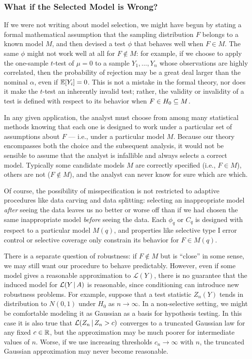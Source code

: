 \documentclass{article}
\theoremstyle{definition}
\newcommand{\cL}{\mathcal{L}}
\newcommand{\sampOrData}{data }
\begin{document}
\subsubsection{What if the Selected Model is Wrong?}\label{sec:modelWrong}

If we were not writing about model selection, we might have begun by stating a formal mathematical assumption that the sampling distribution $F$ belongs to a known model $M$, and then devised a test $\phi$ that behaves well when $F\in M$. The same $\phi$ might not work well at all for $F\notin M$: for example, if we choose to apply the one-sample $t$-test of $\mu=0$ to a sample $Y_1,\ldots,Y_n$ whose observations are highly correlated, then the probability of rejection may be a great deal larger than the nominal $\alpha$, even if $\mathbb{E}[Y_i]=0$. This is not a mistake in the formal theory, nor does it make the $t$-test an inherently invalid test; rather, the validity or invalidity of a test is defined with respect to its behavior when $F\in H_0 \subseteq M$.

In any given application, the analyst must choose from among many statistical methods knowing that each one is designed to work under a particular set of assumptions about $F$ --- i.e., under a particular model $M$. Because our theory encompasses both the choice and the subsequent analysis, it would not be sensible to assume that the analyst is infallible and always selects a correct model. Typically some candidate models $M$ are correctly specified (i.e., $F\in M$), others are not ($F\notin M$), and the analyst can never know for sure which are which.

Of course, the possibility of misspecification is not restricted to adaptive procedures like \sampOrData carving and \sampOrData splitting: selecting an inappropriate model {\em after} seeing the data leaves us no better or worse off than if we had chosen the same inappropriate model {\em before} seeing the data. Each $\phi_q$ or $C_q$ is designed with respect to a particular model $M(q)$, and properties like selective type I error control or selective coverage only constrain its behavior for $F\in M(q)$.

There is a separate question of robustness: if $F\notin M$ but is ``close'' in some sense, we may still want our procedure to behave predictably. However, even if some model gives a reasonable approximation to $\cL(Y)$, there is no guarantee that the induced model for $\cL(Y \gv A)$ is reasonable, since conditioning can introduce new robustness problems.
For example, suppose that a test statistic $Z_n(Y)$ tends in distribution to $N(0,1)$ under $H_0$ as $n\to \infty$. In a non-selective setting, we might be comfortable modeling it as Gaussian as a basis for hypothesis testing. In this case it is also true that ${\cL(Z_n \gv Z_n > c)}$ converges to a truncated Gaussian law for any fixed $c\in \mathbb{R}$, but the approximation may be much poorer for intermediate values of $n$. Worse, if we use increasing thresholds $c_n\to\infty$ with $n$, the truncated Gaussian approximation may never become reasonable.
\end{document}
